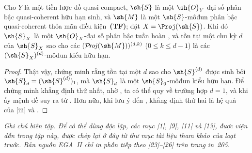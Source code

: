 \documentclass[oneside,10pt]{amsart}
\renewcommand{\leq}{\leqslant}
\def\shProj{\mathcal{P}\!\mathit{roj}}
\newcommand{\oldpage}[2][]{\marginnote{\normalfont\footnotesize\textbf{#1}~|~#2}\ignorespaces}
\let\EGAOriginalLabel\label
\renewcommand{\label}[1]{\phantomsection\EGAOriginalLabel{#1}}
\begin{document}
\begin{proposition}[8.14.14]
\label{II.8.14.14}
Cho $Y$ là một tiền lược đồ quasi-compact, $\sh{S}$ là một $\sh{O}_Y$-đại số phân bậc quasi-coherent hữu hạn sinh, và $\sh{M}$ là một $\sh{S}$-môđun phân bậc quasi-coherent thỏa mãn điều kiện~\textbf{(TF)};
đặt $X=\Proj(\sh{S})$.
Khi đó $\sh{S}_X$ là một $\sh{O}_X$-đại số phân bậc tuần hoàn , và tồn tại một
\oldpage[II]{203}
chu kỳ $d$ của $\sh{S}_X$ sao cho các $(\shProj(\sh{M}))^{(d,k)}$ ($0\leq k\leq d-1$) là các $(\sh{S}_X)^{(d)}$-môđun kiểu hữu hạn.
\end{proposition}

\begin{proof}
Thật vậy,  chứng minh rằng tồn tại một $d$ sao cho $\sh{S}^{(d)}$ được sinh bởi $\sh{S}_d=(\sh{S}^{(d)})_1$, mà $\sh{S}_d$ là một $\sh{S}_0$-môđun kiểu hữu hạn.
Để chứng minh khẳng định thứ nhất, nhờ , ta có thể quy về trường hợp $d=1$, và khi ấy mệnh đề suy ra từ .
Hơn nữa, khi lưu ý đến , khẳng định thứ hai là hệ quả của [iii] và .
\end{proof}
\clearpage
{}
{}
\renewcommand{\refname}{Tài liệu tham khảo}
\noindent\textit{Ghi chú biên tập. Để có thể dùng độc lập, các mục [1], [9],
[11] và [13], được viện dẫn trong tập này, được chép lại ở đây từ thư mục
tài liệu tham khảo của loạt trước. Bản nguồn EGA~II chỉ in phần tiếp theo
[23]--[26] trên trang in~205.}
\par\medskip
\end{document}
